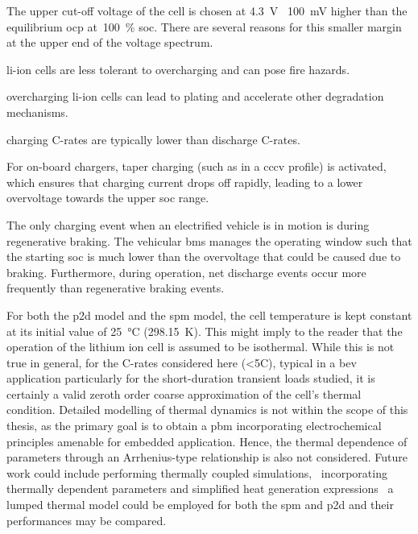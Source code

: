 The  upper   cut-off  voltage   of  the  cell   is  chosen   at  \SI{4.3}{\volt}
\ie~\approx\SI{100}{\milli\volt} higher  than  the  equilibrium \gls{ocp}  at~\SI{100}{\percent} \gls{soc}. There are several  reasons for this smaller margin
at the upper end of the voltage spectrum.
\begin{description}[leftmargin=!,labelwidth=\widthof{\bfseries low
    probabilities},itemsep=1ex]

\item[safety] li-ion  cells are less  tolerant to overcharging and  can pose
    fire hazards.

\item[degradation]  overcharging  li-ion  cells  can  lead  to  plating  and
    accelerate other degradation mechanisms.

\item[low  C-rates]  charging C-rates  are  typically  lower than  discharge
    C-rates.

\item[CCCV charging]  For on-board  chargers, taper charging  (such as  in a
    \gls{cccv} profile) is activated, which  ensures that charging current drops
    off  rapidly, leading  to a  lower overvoltage  towards the  upper \gls{soc}
    range.

\item[low probabilities] The only charging event when an electrified vehicle
    is in motion is during regenerative braking. The vehicular \gls{bms} manages
    the operating window such that the starting \gls{soc} is much lower than the
    overvoltage  that  could  be  caused due  to  braking.  Furthermore,  during
    operation, net discharge events  occur more frequently than regenerative
    braking events.

\end{description}

For  both the  \gls{p2d} model  and the  \gls{spm} model,  the cell  temperature
is   kept   constant   at   its   initial   value   of   \SI{25}{\degreeCelsius}
(\SI{298.15}{\kelvin}). This might imply to the reader that the operation of the
lithium ion cell is assumed to be isothermal. While this is not true in general,
for  the C-rates  considered  here  (<5C), typical  in  a \gls{bev}  application
particularly for the  short-duration transient loads studied, it  is certainly a
valid  zeroth  order  coarse  approximation of  the  cell's  thermal  condition.
Detailed modelling of  thermal dynamics is not within the  scope of this thesis,
as  the primary  goal is  to  obtain a  \gls{pbm} incorporating  electrochemical
principles amenable for  embedded application. Hence, the  thermal dependence of
parameters through an Arrhenius-type relationship is also not considered. Future
work could  include performing thermally coupled  simulations, \ie~incorporating
thermally dependent parameters and  simplified heat generation expressions \eg~a
lumped thermal model could be employed  for both the \gls{spm} and \gls{p2d} and
their performances may be compared.

